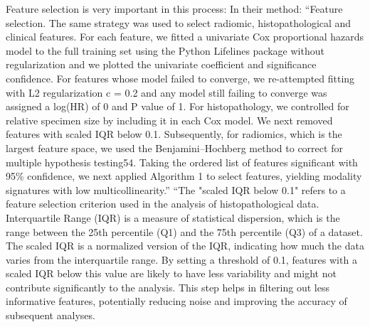 \documentclass{article}%
\begin{document}
\newline%
\newline%
%
Feature selection is very important in this process: %
\newline%
\newline%
%
In their method: “Feature selection. The same strategy was used to select radiomic, histopathological and clinical features. For each feature, we fitted a univariate Cox proportional hazards model to the full training set using the Python Lifelines package without regularization and we plotted the univariate coefficient and significance confidence. For features whose model failed to converge, we re{-}attempted fitting with L2 regularization c = 0.2 and any model still failing to converge was assigned a log(HR) of 0 and P value of 1. For histopathology, we controlled for relative specimen size by including it in each Cox model. We next removed features with scaled IQR below 0.1. Subsequently, for radiomics, which is the largest feature space, we used the Benjamini–Hochberg method to correct for multiple hypothesis testing54. Taking the ordered list of features significant with 95\% confidence, we next applied Algorithm 1 to select features, yielding modality signatures with low multicollinearity.”%
\newline%
\newline%
%
%
\newline%
\newline%
%
“The "scaled IQR below 0.1" refers to a feature selection criterion used in the analysis of histopathological data. Interquartile Range (IQR) is a measure of statistical dispersion, which is the range between the 25th percentile (Q1) and the 75th percentile (Q3) of a dataset. The scaled IQR is a normalized version of the IQR, indicating how much the data varies from the interquartile range. By setting a threshold of 0.1, features with a scaled IQR below this value are likely to have less variability and might not contribute significantly to the analysis. This step helps in filtering out less informative features, potentially reducing noise and improving the accuracy of subsequent analyses.%
\newline%
\newline%
%
%
\newline%
\newline%
%
\end{document}
